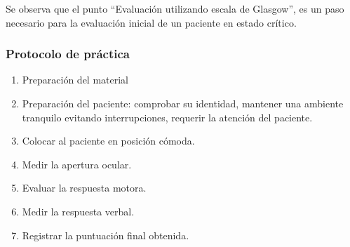 Se observa que el punto \enquote{Evaluación utilizando escala de Glasgow}, es un
paso necesario para la evaluación inicial de un paciente en estado crítico.

\subsubsection{Protocolo de práctica}
\label{sec:glasgow_protocolo}

\begin{enumerate}
\item Preparación del material
\item Preparación del paciente: comprobar su identidad, mantener una ambiente
    tranquilo evitando interrupciones, requerir la atención del paciente.
\item Colocar al paciente en posición cómoda.
\item
    Medir la apertura ocular.
\item Evaluar la respuesta motora.
\item Medir la respuesta verbal.
\item Registrar la puntuación final obtenida.
\end{enumerate}
